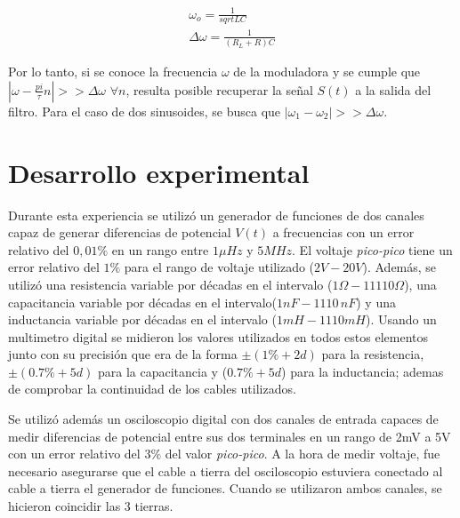 \documentclass[11pt,a4paper]{article}
\begin{document}
\begin{equation}
\begin{split}
\omega_o = \frac{1}{sqrt{LC}}\\
\Delta\omega = \frac{1}{(R_L+R)C}
\end{split}
\label{eq:antiresonante}
\end{equation}

Por lo tanto, si se conoce la frecuencia $\omega$ de la moduladora y se cumple que $|\omega-\frac{pi}{\tau}n|>> \Delta\omega$ $\forall n$, resulta posible recuperar la señal $S(t)$ a la salida del filtro. Para el caso de dos sinusoides, se busca que $|\omega_1-\omega_2|>> \Delta\omega$.



\section{Desarrollo experimental}
Durante esta experiencia se utilizó un generador de funciones de dos canales capaz de generar diferencias de potencial $V(t)$ a frecuencias con un error relativo del $0,01\%$ en un rango entre $1\mu Hz$ y $5MHz$. El voltaje \textit{pico-pico} tiene un error relativo del $1\%$ para el rango de voltaje utilizado ($2V-20V$). Además, se utilizó una resistencia variable por décadas en el intervalo ($1\Omega-11110\Omega$), una capacitancia variable por décadas en el intervalo($1nF-1110\,nF$) y una inductancia variable por décadas en el intervalo ($1mH-1110mH$). Usando un multimetro digital se midieron los valores utilizados en todos estos elementos junto con su precisión que era de la forma $\pm(1\%+2d)$ para la resistencia, $\pm(0.7\%+5d)$ para la capacitancia y ($0.7\% +5d$) para la inductancia; ademas de comprobar la continuidad de los cables utilizados.

Se utilizó además un osciloscopio digital con dos canales de entrada capaces de medir diferencias de potencial entre sus dos terminales en un rango de 2mV a 5V con un error relativo del $3\%$ del valor \textit{pico-pico}. A la hora de medir voltaje, fue necesario asegurarse que el cable a tierra del osciloscopio estuviera conectado al cable a tierra el generador de funciones. Cuando se utilizaron ambos canales, se hicieron coincidir las 3 tierras.
\end{document}
